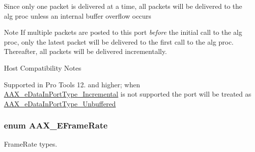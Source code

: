 \begin{Desc}
\begin{description}
Since only one packet is delivered at a time, all packets will be delivered to the alg proc unless an internal buffer overflow occurs

\begin{DoxyNote}{Note}
If multiple packets are posted to this port {\itshape before} the initial call to the alg proc, only the latest packet will be delivered to the first call to the alg proc. Thereafter, all packets will be delivered incrementally.
\end{DoxyNote}
\begin{DoxyRefDesc}{Host Compatibility Notes}
\item[\hyperlink{a00380__compatibility_notes000045}{Host Compatibility Notes}]Supported in Pro Tools 12. and higher; when \hyperlink{a00206_ab5677b173ad8647c24d34d28272d11fca4c356b21e878cfafca33ff61e1044b2e}{A\+A\+X\+\_\+e\+Data\+In\+Port\+Type\+\_\+\+Incremental} is not supported the port will be treated as \hyperlink{a00206_ab5677b173ad8647c24d34d28272d11fca43dc59a68b369ee607f70700bfd02c2d}{A\+A\+X\+\_\+e\+Data\+In\+Port\+Type\+\_\+\+Unbuffered} \end{DoxyRefDesc}
\end{description}
\end{Desc}
\hypertarget{a00206_a1271a51553bf508de59864334111aa8f}{}
\subsubsection[{A\+A\+X\+\_\+\+E\+Frame\+Rate}]{\setlength{\rightskip}{0pt plus 5cm}enum {\bf A\+A\+X\+\_\+\+E\+Frame\+Rate}}\label{a00206_a1271a51553bf508de59864334111aa8f}


Frame\+Rate types. 

